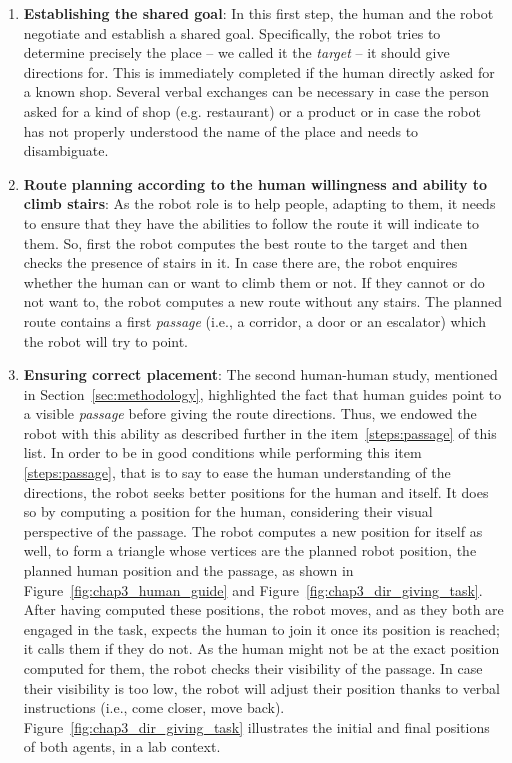 \documentclass[a4paper,11pt,twoside]{StyleThese}
\begin{document}
\begin{enumerate}
	\item \textbf{Establishing the shared goal}: In this first step, the human and the robot negotiate and establish a shared goal. Specifically, the robot tries to determine precisely the place -- we called it the \textit{target} -- it should give directions for. This is immediately completed if the human directly asked for a known shop. Several verbal exchanges can be necessary in case the person asked for a kind of shop (e.g. restaurant) or a product or in case the robot has not properly understood the name of the place and needs to disambiguate.
	\item \textbf{Route planning according to the human willingness and ability to climb stairs}: As the robot role is to help people, adapting to them, it needs to ensure that they have the abilities to follow the route it will indicate to them. So, first the robot computes the best route to the target and then checks the presence of stairs in it. In case there are, the robot enquires whether the human can or want to climb them or not. If they cannot or do not want to, the robot computes a new route without any stairs. The planned route contains a first  \textit{passage} (i.e., a corridor, a door or an escalator) which the robot will try to point.
	\item \textbf{Ensuring correct placement}: The second human-human study, mentioned in Section~\ref{sec:methodology}, highlighted the fact that human guides point to a visible \textit{passage} before giving the route directions. Thus, we endowed the robot with this ability as described further in the item~\ref{steps:passage} of this list. In order to be in good conditions while performing this item \ref{steps:passage}, that is to say to ease the human understanding of the directions, the robot seeks better positions for the human and itself. It does so by computing a position for the human, considering their visual perspective of the passage.
	The robot computes a new position for itself as well, to form a triangle whose vertices are the planned robot position, the planned human position and the passage, as shown in Figure~\ref{fig:chap3_human_guide} and Figure~\ref{fig:chap3_dir_giving_task}. After having computed these positions, the robot moves, and as they both are engaged in the task, expects the human to join it once its position is reached; it calls them if they do not. As the human might not be at the exact position computed for them, the robot checks their visibility of the passage. In case their visibility is too low, the robot will adjust their position thanks to verbal instructions (i.e., come closer, move back). Figure~\ref{fig:chap3_dir_giving_task} illustrates the initial and final positions of both agents, in a lab context. 

\end{enumerate}
\end{document}
